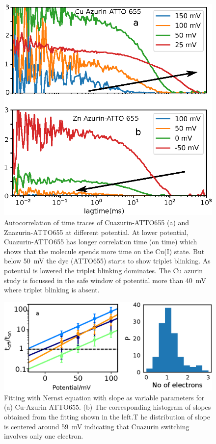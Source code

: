 \documentclass[11pt,a4paper,onecolumn]{article}
\begin{document}
\begin{figure}
  \centering
  \includegraphics[]{fcs_comparision}
  \makeatletter
  \renewcommand{\fnum@figure}{\figurename~S\thefigure}
  \makeatother
  \caption{Autocorrelation of time traces of Cuazurin-ATTO655 (a) and Znazurin-ATTO655 at different potential. 
  At lower potential, Cuazurin-ATTO655 has longer correlation time (on time) which shows that the molecule spends more time on the Cu(I) state.
  But below \SI{50}{\mV} the dye (ATTO655) starts to show triplet blinking.
  As potential is lowered the triplet blinking dominates.
  The Cu azurin study is focussed in the safe window of potential more than \SI{40}{\mV} where triplet blinking is absent.}
  \label{SIfig:fcscomparision}
\end{figure}
\begin{figure}
  \centering
  \includegraphics[width=\textwidth,keepaspectratio]{SI_potential_slope}
	\makeatletter
	\renewcommand{\fnum@figure}{\figurename~S\thefigure}
	\makeatother
  \caption{Fitting with Nernst equation with slope as variable parameters for  (a) Cu-Azurin ATTO655. 
  (b) The corresponding histogram of slopes obtained from the fitting shown in the left.T
  he distribution of slope is centered around \SI{59}{\mV} indicating that Cuazurin switching  involves only one electron.}
  \label{SIfig:potential_slope}
\end{figure}
\end{document}

